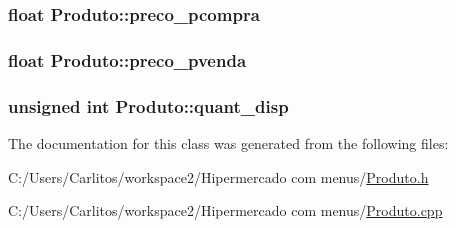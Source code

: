 \label{class_produto_a68b0af895e00da960bea4fb9d22908a4}
\hypertarget{class_produto_a90ee7ed615f3d9e0b2f0972608c00a87}{
\subsubsection[{preco\_\-pcompra}]{\setlength{\rightskip}{0pt plus 5cm}float {\bf Produto::preco\_\-pcompra}}}
\label{class_produto_a90ee7ed615f3d9e0b2f0972608c00a87}
\hypertarget{class_produto_aafe61b6a241575ca22bfd5ef6880eacc}{
\subsubsection[{preco\_\-pvenda}]{\setlength{\rightskip}{0pt plus 5cm}float {\bf Produto::preco\_\-pvenda}}}
\label{class_produto_aafe61b6a241575ca22bfd5ef6880eacc}
\hypertarget{class_produto_a4587e7d30d4fc36691e1d13d5b2ef6a1}{
\subsubsection[{quant\_\-disp}]{\setlength{\rightskip}{0pt plus 5cm}unsigned int {\bf Produto::quant\_\-disp}}}
\label{class_produto_a4587e7d30d4fc36691e1d13d5b2ef6a1}


The documentation for this class was generated from the following files:\begin{DoxyCompactItemize}
\item 
C:/Users/Carlitos/workspace2/Hipermercado com menus/\hyperlink{_produto_8h}{Produto.h}\item 
C:/Users/Carlitos/workspace2/Hipermercado com menus/\hyperlink{_produto_8cpp}{Produto.cpp}\end{DoxyCompactItemize}
